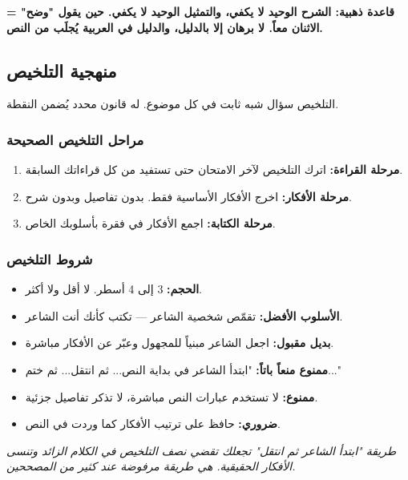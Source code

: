 \documentclass[12pt,a4paper]{book}
\newcommand{\quoteAr}[1]{%
	\begin{myquote}
		\itshape #1
	\end{myquote}
}
\newcommand{\importantAr}[1]{%
	\begin{important}
		\bfseries #1
	\end{important}
}
\begin{document}
	\importantAr{قاعدة ذهبية: الشرح الوحيد لا يكفي، والتمثيل الوحيد لا يكفي. حين يقول "وضح" = الاثنان معاً. لا برهان إلا بالدليل، والدليل في العربية يُجلَب من النص.}
	
	\subsection{منهجية التلخيص}
	
	التلخيص سؤال شبه ثابت في كل موضوع. له قانون محدد يُضمن النقطة.
	
	\subsubsection*{مراحل التلخيص الصحيحة}
	
	\begin{enumerate}
		\item \textbf{مرحلة القراءة:} اترك التلخيص لآخر الامتحان حتى تستفيد من كل قراءاتك السابقة.
		\item \textbf{مرحلة الأفكار:} اخرج الأفكار الأساسية فقط. بدون تفاصيل وبدون شرح.
		\item \textbf{مرحلة الكتابة:} اجمع الأفكار في فقرة بأسلوبك الخاص.
	\end{enumerate}
	
	\subsubsection*{شروط التلخيص}
	
	\begin{itemize}
		\item \textbf{الحجم:} 3 إلى 4 أسطر. لا أقل ولا أكثر.
		\item \textbf{الأسلوب الأفضل:} تقمّص شخصية الشاعر — تكتب كأنك أنت الشاعر.
		\item \textbf{بديل مقبول:} اجعل الشاعر مبنياً للمجهول وعبّر عن الأفكار مباشرة.
		\item \textbf{ممنوع منعاً باتاً:} "ابتدأ الشاعر في بداية النص... ثم انتقل... ثم ختم..."
		\item \textbf{ممنوع:} لا تستخدم عبارات النص مباشرة، لا تذكر تفاصيل جزئية.
		\item \textbf{ضروري:} حافظ على ترتيب الأفكار كما وردت في النص.
	\end{itemize}
	
	\quoteAr{طريقة "ابتدأ الشاعر ثم انتقل" تجعلك تقضي نصف التلخيص في الكلام الزائد وتنسى الأفكار الحقيقية. هي طريقة مرفوضة عند كثير من المصححين.}
	
\end{document}
